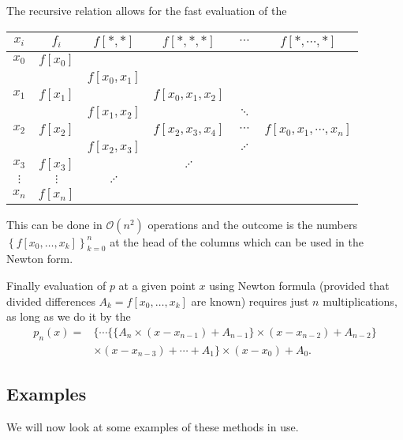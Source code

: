 \documentclass[a4paper]{scrartcl}
\begin{document}
The recursive relation allows for the fast evaluation of the 
\begin{center}
  \begin{tabular}{cccccc}
    \toprule
    $x_i$ & $f_i$ & $f[*, *]$ & $f[*, *, *]$ & $\cdots$ & $f[*, \cdots,*]$\\
    \midrule
    $x_0$ & $f[x_0]$\\
    & & $f[x_0, x_1]$\\
    $x_1$ & $f[x_1]$ & & $f[x_0, x_1, x_2]$ \\
    & & $f[x_1, x_2]$ & & $\ddots$\\
    $x_2$ & $f[x_2]$ & & $f[x_2, x_3, x_4]$ & $\cdots$ & $f[x_0, x_1, \cdots, x_n]$\\
    & & $f[x_2, x_3]$ & & $\iddots$\\
    $x_3$ & $f[x_3]$ & & $\iddots$\\
    $\vdots$ & $\vdots$ & $\iddots$ &\\
    $x_n$ & $f[x_n]$\\
    \bottomrule
  \end{tabular}
\end{center}
This can be done in $\mathcal{O}\left(n^{2}\right)$ operations and the outcome is the numbers $\left\{f\left[x_{0}, \ldots, x_{k}\right]\right\}_{k=0}^{n}$ at the head of the columns which can be used in the Newton form.

Finally evaluation of $p$ at a given point $x$ using Newton formula (provided that divided differences $A_k = f[x_0, \dots, x_k]$ are known) requires just $n$ multiplications, as long as we do it by the 
\begin{align*}
p_{n}(x)=&\{\cdots\{\{A_{n} \times(x-x_{n-1})+A_{n-1}\} \times(x-x_{n-2})+A_{n-2}\} \\
& \times(x-x_{n-3})+\cdots+A_{1}\} \times(x-x_{0})+A_{0} .
\end{align*}

\subsection{Examples}

We will now look at some examples of these methods in use.
\end{document}
